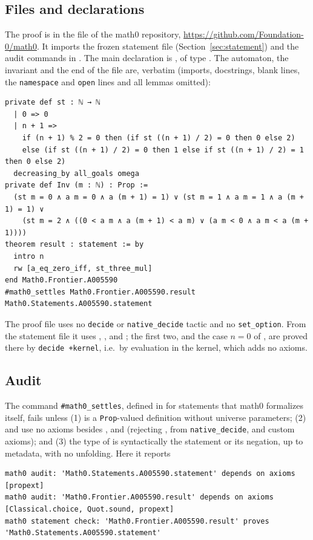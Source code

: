 \documentclass[11pt]{amsart}
\theoremstyle{plain}
\theoremstyle{definition}
\begin{document}
\subsection*{Files and declarations}
The proof is in the file  of the math0 repository, \url{https://github.com/Foundation-0/math0}. It imports the frozen statement file  (Section~\ref{sec:statement}) and the audit commands in . The main declaration is , of type . The automaton, the invariant and the end of the file are, verbatim (imports, docstrings, blank lines, the \texttt{namespace} and \texttt{open} lines and all lemmas omitted):
\begin{lstlisting}
private def st : ℕ → ℕ
  | 0 => 0
  | n + 1 =>
    if (n + 1) % 2 = 0 then (if st ((n + 1) / 2) = 0 then 0 else 2)
    else (if st ((n + 1) / 2) = 0 then 1 else if st ((n + 1) / 2) = 1 then 0 else 2)
  decreasing_by all_goals omega
private def Inv (m : ℕ) : Prop :=
  (st m = 0 ∧ a m = 0 ∧ a (m + 1) = 1) ∨ (st m = 1 ∧ a m = 1 ∧ a (m + 1) = 1) ∨
    (st m = 2 ∧ ((0 < a m ∧ a (m + 1) < a m) ∨ (a m < 0 ∧ a m < a (m + 1))))
theorem result : statement := by
  intro n
  rw [a_eq_zero_iff, st_three_mul]
end Math0.Frontier.A005590
#math0_settles Math0.Frontier.A005590.result Math0.Statements.A005590.statement
\end{lstlisting}
The proof file uses no \texttt{decide} or \texttt{native\_decide} tactic and no \texttt{set\_option}. From the statement file it uses , ,  and ; the first two, and the case $n=0$ of , are proved there by \texttt{decide +kernel}, i.e.\ by evaluation in the kernel, which adds no axioms.

\subsection*{Audit}
The command \texttt{\#math0\_settles}, defined in  for statements that math0 formalizes itself, fails unless (1)  is a \texttt{Prop}-valued definition without universe parameters; (2)  and  use no axioms besides ,  and  (rejecting ,  from \texttt{native\_decide}, and custom axioms); and (3) the type of  is syntactically the statement or its negation, up to metadata, with no unfolding. Here it reports
\begin{lstlisting}[basicstyle=\ttfamily\scriptsize]
math0 audit: 'Math0.Statements.A005590.statement' depends on axioms [propext]
math0 audit: 'Math0.Frontier.A005590.result' depends on axioms [Classical.choice, Quot.sound, propext]
math0 statement check: 'Math0.Frontier.A005590.result' proves 'Math0.Statements.A005590.statement'
\end{lstlisting}
\end{document}
